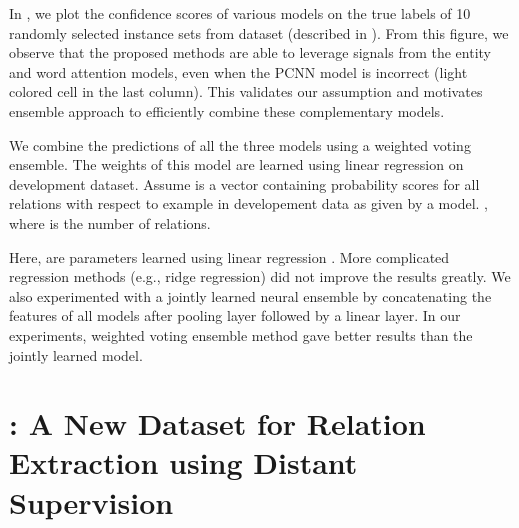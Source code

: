 \documentclass{article}
\begin{document}
In , we plot the confidence scores of various models on the true labels of 10 randomly selected instance sets from \newdataset{} dataset (described in ). From this figure, we observe that the proposed methods are able to leverage signals from the entity and word attention models, even when the PCNN model is incorrect (light colored cell in the last column). This validates our assumption and motivates ensemble approach to efficiently combine these complementary models.

We combine the predictions of all the three models using a weighted voting ensemble. The weights of this model are learned using linear regression on development dataset. Assume  is a vector containing probability scores for all relations with respect to  example in developement data as given by a model. , where  is the number of relations.  


Here,  are parameters learned using linear regression \cite{scikit-learn}. More complicated regression methods (e.g., ridge regression) did not improve the results greatly. We also experimented with a jointly learned neural ensemble by concatenating the features of all models after pooling layer followed by a linear layer. In our experiments, weighted voting ensemble method gave better results than the jointly learned model. 

 \section{\newdatasetshort{}: A New Dataset for Relation Extraction using Distant Supervision}
\label{sec:dataset}
\end{document}

